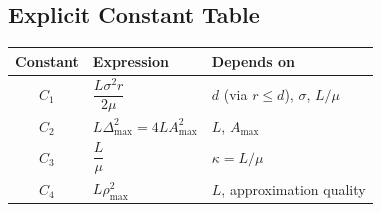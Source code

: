 \subsection{Explicit Constant Table}

\begin{center}
\begin{tabular}{cll}
\toprule
\textbf{Constant} & \textbf{Expression} & \textbf{Depends on} \\
\midrule
$C_1$ & $\dfrac{L\sigma^2 r}{2\mu}$ & $d$ (via $r \leq d$), $\sigma$, $L/\mu$ \\[8pt]
$C_2$ & $L\Delta_{\max}^2 = 4LA_{\max}^2$ & $L$, $A_{\max}$ \\[4pt]
$C_3$ & $\dfrac{L}{\mu}$ & $\kappa = L/\mu$ \\[8pt]
$C_4$ & $L\rho_{\max}^2$ & $L$, approximation quality \\
\bottomrule
\end{tabular}
\end{center}
